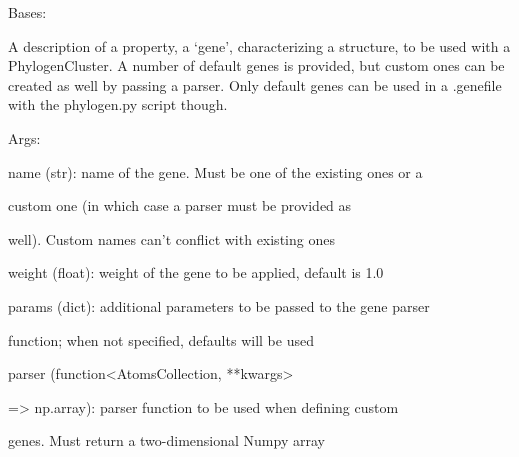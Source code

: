 \documentclass[letterpaper,10pt,english]{sphinxmanual}
\begin{document}
\begin{fulllineitems}
\label{doctree/soprano.analyse.phylogen.genes:soprano.analyse.phylogen.genes.Gene}
Bases: 

A description of a property, a `gene', characterizing a structure, to be
used with a PhylogenCluster. A number of default genes is provided, but
custom ones can be created as well by passing a parser. Only default genes
can be used in a .genefile with the phylogen.py script though.

\begin{DUlineblock}{0em}
\item[] Args:
\item[]
\begin{DUlineblock}{\DUlineblockindent}
\item[] name (str): name of the gene. Must be one of the existing ones or a
\item[]
\begin{DUlineblock}{\DUlineblockindent}
\item[] custom one (in which case a parser must be provided as
\item[] well). Custom names can't conflict with existing ones
\end{DUlineblock}
\item[] weight (float): weight of the gene to be applied, default is 1.0
\item[] params (dict): additional parameters to be passed to the gene parser
\item[]
\begin{DUlineblock}{\DUlineblockindent}
\item[] function; when not specified, defaults will be used
\end{DUlineblock}
\item[] parser (function\textless{}AtomsCollection, **kwargs\textgreater{}
\item[]
\begin{DUlineblock}{\DUlineblockindent}
\item[] =\textgreater{} np.array): parser function to be used when defining custom
\item[]
\begin{DUlineblock}{\DUlineblockindent}
\item[] genes. Must return a two-dimensional Numpy array

\end{DUlineblock}
\end{DUlineblock}
\end{DUlineblock}
\end{DUlineblock}
\end{fulllineitems}
\end{document}
